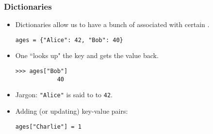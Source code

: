\documentclass[notes]{beamer}
\begin{document}
	\begin{frame}[fragile]
		\frametitle{Dictionaries}
		
		\begin{itemize}
			\item Dictionaries allow us to have a bunch of  associated with certain .
			\begin{lstlisting}[xleftmargin=\dimexpr-\leftmargini]
			ages = {"Alice": 42, "Bob": 40}
			\end{lstlisting}
			
			\item One ``looks up" the key and gets the value back.
			\begin{lstlisting}[xleftmargin=\dimexpr-\leftmargini]
			>>> ages["Bob"]
			40\end{lstlisting}
			
			\item Jargon: \lstinline|"Alice"| is said to  to \lstinline|42|.
			
			
			\item Adding (or updating) key-value pairs:
			\begin{lstlisting}[xleftmargin=\dimexpr-\leftmargini]
			ages["Charlie"] = 1
			\end{lstlisting}
		\end{itemize}
	\end{frame}
	
\end{document}
